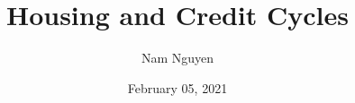 \documentclass[10pt]{beamer}
\title[Credit \& Housing]{Housing and Credit Cycles} %
\author{Nam Nguyen} %
\institute[nguyent3@uwm.edu]
{
	
	
	\medskip 
	
	Department of Economics \\  
	University of Wisconsin - Milwaukee \\ %
	
	\bigskip
	
	 Paper Presentation for: \\
		\smallskip
	\textit{Weekly Friday Meeting}
}
\date{February 05, 2021} %
\begin{document}
\begin{frame}
\titlepage %
\end{frame}






 
 
 
 
 
 

\end{document}
